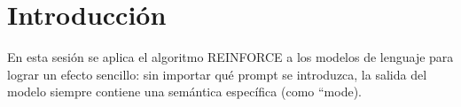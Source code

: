 \section{Introducción}
En esta sesión se aplica el algoritmo REINFORCE a los modelos de lenguaje para lograr un efecto sencillo: sin importar qué prompt se introduzca, la salida del modelo siempre contiene una semántica específica (como ``mode).

